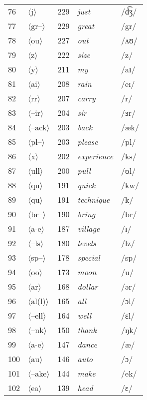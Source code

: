 \begin{longtable}{lllll}
76 & $\langle$j$\rangle$ & 229 & \textit{just} & /d͡ʒ/ \\
77 & $\langle$gr--$\rangle$ & 229 & \textit{great} & /gr/ \\
78 & $\langle$ou$\rangle$ & 227 & \textit{out} & /ʌʊ/ \\
79 & $\langle$z$\rangle$ & 222 & \textit{size} & /z/ \\
80 & $\langle$y$\rangle$ & 211 & \textit{my} & /aɪ/ \\
81 & $\langle$ai$\rangle$ & 208 & \textit{rain} & /eɪ/ \\
82 & $\langle$rr$\rangle$ & 207 & \textit{carry} & /r/ \\
83 & $\langle$--ir$\rangle$ & 204 & \textit{sir} & /ɜr/ \\
84 & $\langle$--ack$\rangle$ & 203 & \textit{back} & /æk/ \\
85 & $\langle$pl--$\rangle$ & 203 & \textit{please} & /pl/ \\
86 & $\langle$x$\rangle$ & 202 & \textit{experience} & /ks/ \\
87 & $\langle$ull$\rangle$ & 200 & \textit{pull} & /ʊl/ \\
88 & $\langle$qu$\rangle$ & 191 & \textit{quick} & /kw/ \\
89 & $\langle$qu$\rangle$ & 191 & \textit{technique} & /k/ \\
90 & $\langle$br--$\rangle$ & 190 & \textit{bring} & /br/ \\
91 & $\langle$a-e$\rangle$ & 187 & \textit{village} & /ɪ/ \\
92 & $\langle$--ls$\rangle$ & 180 & \textit{levels} & /lz/ \\
93 & $\langle$sp--$\rangle$ & 178 & \textit{special} & /sp/ \\
94 & $\langle$oo$\rangle$ & 173 & \textit{moon} & /u/ \\
95 & $\langle$ar$\rangle$ & 168 & \textit{dollar} & /ər/ \\
96 & $\langle$al(l)$\rangle$ & 165 & \textit{all} & /ɔl/ \\
97 & $\langle$--ell$\rangle$ & 164 & \textit{well} & /ɛl/ \\
98 & $\langle$--nk$\rangle$ & 150 & \textit{thank} & /ŋk/ \\
99 & $\langle$a-e$\rangle$ & 147 & \textit{dance} & /æ/ \\
100 & $\langle$au$\rangle$ & 146 & \textit{auto} & /ɔ/ \\
101 & $\langle$--ake$\rangle$ & 144 & \textit{make} & /ek/ \\
102 & $\langle$ea$\rangle$ & 139 & \textit{head} & /ɛ/ \\

\end{longtable}
